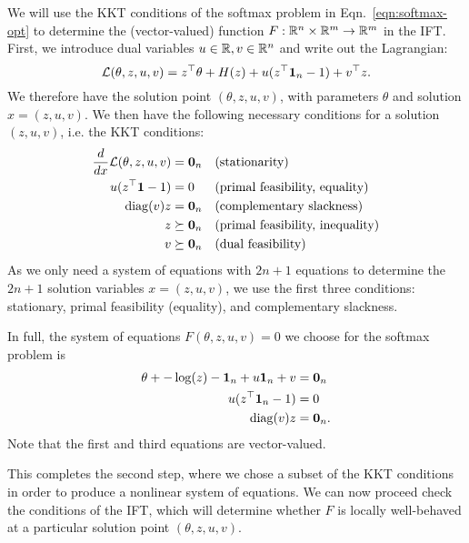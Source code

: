 \documentclass[11pt]{article}
\begin{document}
We will use the KKT conditions of the softmax problem in
Eqn.~\ref{eqn:softmax-opt} to determine the (vector-valued) function $F:\mathbb{R}^n\times\mathbb{R}^m\to\mathbb{R}^m$
in the IFT.
First, we introduce dual variables $u\in\mathbb{R},v\in\mathbb{R}^n$ and write out the Lagrangian:
$$\mathcal{L}(\theta, z, u, v) = z^\top\theta + H(z) + u(z^\top \mathbf{1}_n - 1) + v^\top z.$$
We therefore have the solution point $(\theta,z,u,v)$, with parameters $\theta$
and solution $x=(z,u,v)$.
We then have the following necessary conditions for a solution $(z,u,v)$,
i.e. the KKT conditions:
\begin{equation}
\begin{aligned}
\frac{d}{dx} \mathcal{L}(\theta, z,u,v) &= \mathbf{0}_n && \textrm{(stationarity)}\\
u(z^{\top} \mathbf{1} - 1) &= 0 && \textrm{(primal feasibility, equality)}\\
\mathrm{diag}(v)z &= \mathbf{0}_{n} && \textrm{(complementary slackness)}\\
z &\succeq \mathbf{0}_n && \textrm{(primal feasibility, inequality)}\\
v &\succeq \mathbf{0}_n && \textrm{(dual feasibility)}
\end{aligned}
\end{equation}
As we only need a system of equations with $2n+1$ equations to
determine the $2n+1$ solution variables $x=(z,u,v)$,
we use the first three conditions: stationary, primal feasibility (equality),
and complementary slackness.

In full, the system of equations $F(\theta, z,u,v) = 0$ we choose
for the softmax problem is
\begin{equation}
\label{eqn:system}
\begin{aligned}
\theta + -\log(z) - \mathbf{1}_n + u\mathbf{1}_n + v &= \mathbf{0}_n\\
u(z^{\top} \mathbf{1}_n - 1) &= 0\\
\mathrm{diag}(v)z &= \mathbf{0}_n.
\end{aligned}
\end{equation}
Note that the first and third equations are vector-valued.

This completes the second step, where we chose a subset of the KKT conditions
in order to produce a nonlinear system of equations.
We can now proceed check the conditions of the IFT,
which will determine whether $F$ is locally well-behaved
at a particular solution point $(\theta, z,u,v)$.
\end{document}
